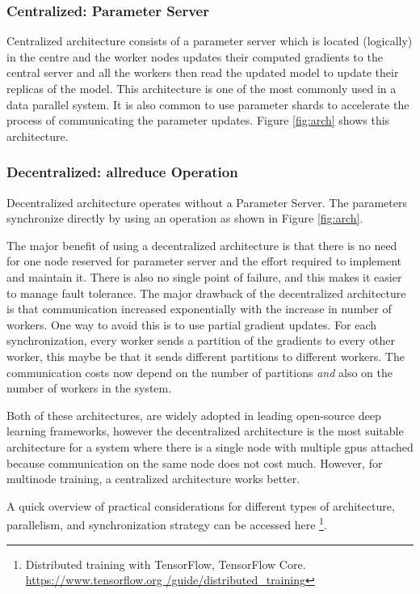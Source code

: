 \subsubsection{Centralized: Parameter Server}
Centralized architecture consists of a parameter server which is located (logically) in the centre and the worker nodes updates their computed gradients to the central server and all the workers then read the updated model to update their replicas of the model. This architecture is one of the most commonly used in a data parallel system. It is also common to use parameter shards to accelerate the process of communicating the parameter updates. Figure \ref{fig:arch} shows this architecture.

\subsubsection{Decentralized: allreduce Operation}
Decentralized architecture operates without a Parameter Server. The parameters synchronize directly by using an  operation as shown in Figure \ref{fig:arch}. 

The major benefit of using a decentralized architecture is that there is no need for one node reserved for parameter server and the effort required to implement and maintain it. There is also no single point of failure, and this makes it easier to manage fault tolerance. The major drawback of the decentralized architecture is that communication increased exponentially with the increase in number of workers. One way to avoid this is to use partial gradient updates. For each synchronization, every worker sends a partition of the gradients to every other worker, this maybe be that it sends different partitions to different workers.  The communication costs now depend on the number of partitions \emph{and} also on the number of workers in the system. 

Both of these architectures, are widely adopted in leading open-source deep learning frameworks, however the decentralized architecture is the most suitable architecture for a system where there is a single node with multiple \acrshort{gpu}s attached because communication on the same node does not cost much. However, for multinode training, a centralized architecture works better. 

A quick overview of practical considerations for different types of architecture, parallelism, and synchronization strategy can be accessed here \footnote{Distributed training with TensorFlow, TensorFlow Core. \href{https://www.tensorflow.org/guide/distributed\_training}{https://www.tensorflow.org /guide/distributed\_training} }. 

